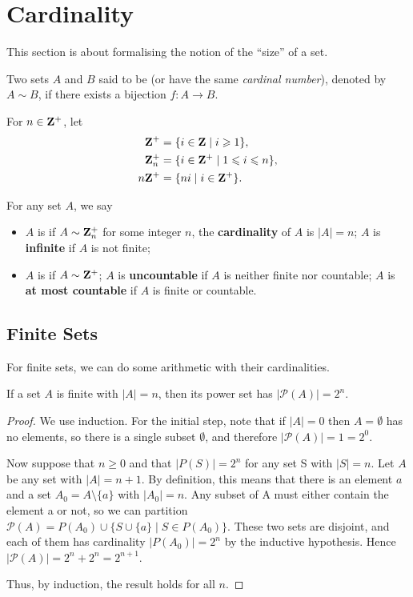 \section{Cardinality}
This section is about formalising the notion of the ``size'' of a set.

\begin{definition}
Two sets $A$ and $B$ said to be  (or have the same \emph{cardinal number}), denoted by $A\sim B$, if there exists a bijection $f:A\to B$. 
\end{definition}

\begin{notation}
For $n\in\mathbf Z^+$, let
\begin{align*}
\mathbf Z^+&=\{i\in\mathbf Z\mid i\geqslant1\},\\
\mathbf Z_n^+&=\{i\in\mathbf Z^+\mid 1\leqslant i\leqslant n\},\\
n\mathbf Z^+&=\{ni\mid i\in\mathbf Z^+\}.
\end{align*}
\end{notation}

\begin{definition}
For any set $A$, we say
\begin{itemize}
\item $A$ is  if $A\sim\mathbf Z_n^+$ for some integer $n$, the \textbf{cardinality} of $A$ is $|A|=n$; $A$ is \textbf{infinite} if $A$ is not finite;
\item $A$ is  if $A\sim \mathbf Z^+$; $A$ is \textbf{uncountable} if $A$ is neither finite nor countable; $A$ is \textbf{at most countable} if $A$ is finite or countable.
\end{itemize}
\end{definition}

\subsection{Finite Sets}
For finite sets, we can do some arithmetic with their cardinalities.

\begin{proposition}
If a set $A$ is finite with $|A| = n$, then its power set has $|\mathcal{P}(A)| = 2^n$.
\end{proposition}

\begin{proof}
We use induction. For the initial step, note that if $|A| = 0$ then $A = \emptyset$ has no elements, so there is a single subset $\emptyset$, and therefore $|\mathcal{P}(A)| = 1 = 2^0$.

Now suppose that $n \ge 0$ and that $|P(S)| = 2^n$ for any set S with $|S| = n$. Let $A$ be any set with $|A| = n+1$. By definition, this means that there is an element $a$ and a set $A_0 = A\setminus\{a\}$ with $|A_0| = n$. Any subset of A must either contain the element a or not, so we can partition $\mathcal{P}(A) = P(A_0) \cup \{S \cup \{a\} \mid S \in P(A_0)\}$. These two sets are disjoint, and each of them has cardinality $|P(A_0)| = 2^n$ by the inductive hypothesis. Hence $|\mathcal{P}(A)| = 2^n + 2^n = 2^{n+1}$.

Thus, by induction, the result holds for all $n$.
\end{proof}

